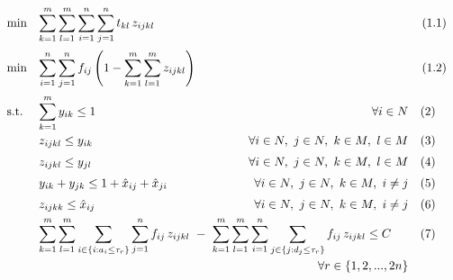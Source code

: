\documentclass[preprint,12pt,authoryear]{elsarticle}
\begin{document}
\begin{equation*}
    \begin{array}{ll@{}ll}
    \text{min}  & \displaystyle\sum\limits^{m}_{k=1} \sum^{m}_{l=1} \sum^{n}_{i=1} \sum^{n}_{j=1} t_{kl} \, z_{ijkl} \  &  \hspace{4mm} (1.1) \vspace{2mm}\\
    \text{min} & \displaystyle\sum^{n}_{i=1} \sum^{n}_{j=1} f_{ij} \left( 1-\sum^{m}_{k=1} \sum^{m}_{l=1} z_{ijkl} \right)   &  \hspace{4mm} (1.2) \vspace{2mm}\\
    \text{s.t.}     & \displaystyle\sum\limits^{m}_{k=1} y_{ik} \leq 1   \hfill   \forall i \in N & \quad (2)\vspace{1mm}\\
                    & z_{ijkl} \leq y_{ik}   \hfill   \forall i\in N, \ j \in N, \ k \in M, \ l \in M & \quad (3)\vspace{2mm}\\
                    & z_{ijkl} \leq y_{jl}   \hfill   \forall i\in N, \ j \in N, \ k \in M, \ l \in M & \quad (4) \vspace{2mm}\\
                    & y_{ik} + y_{jk} \leq 1 + \hat{x}_{ij} + \hat{x}_{ji}   \hfill   \forall i\in N, \ j \in N, \ k \in M,  \ i \neq j & \quad (5)  \vspace{2mm}\\
                    & z_{ijkk} \leq \hat{x}_{ij}   \hfill   \forall i\in N, \ j \in N, \ k \in M, \  i \neq j &  \quad (6)  \vspace{1.5mm}\\
                    & \displaystyle\sum\limits_{k=1}^{m} \sum_{l=1}^{m} \sum_{i\in\{i:a_{i} \le \tau_r\}} \sum_{j=1}^{n} f_{ij} \, z_{ijkl} \ - \ \sum_{k=1}^{m} \sum_{l=1}^{m} \sum_{i=1}^{n} \sum_{j\in\{j:d_{j} \le \tau_r\}} f_{ij} \, z_{ijkl} \le  C \hspace{0.5cm} & \quad  (7)  \vspace{1mm}\\ 
                    &  \hfill  \forall r \in \{1,2,...,2n\}&  \vspace{3mm}\\ 

\end{array}
\end{equation*}
\end{document}
